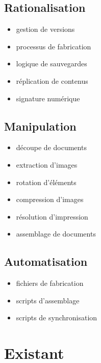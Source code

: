 \documentclass[12pt]{extarticle}
\begin{document}
\subsection{Rationalisation}
\begin{itemize}
\item{gestion de versions}
\item{processus de fabrication}
\item{logique de sauvegardes}
\item{réplication de contenus}
\item{signature numérique}
\end{itemize}

\pagebreak
\subsection{Manipulation}
\begin{itemize}
\item{découpe de documents}
\item{extraction d’images}
\item{rotation d’éléments}
\item{compression d’images}
\item{résolution d’impression}
\item{assemblage de documents}
\end{itemize}

\subsection{Automatisation}
\begin{itemize}
\item{fichiers de fabrication}
\item{scripts d’assemblage}
\item{scripts de synchronisation}
\end{itemize}

\pagebreak
\section{Existant}
\end{document}

